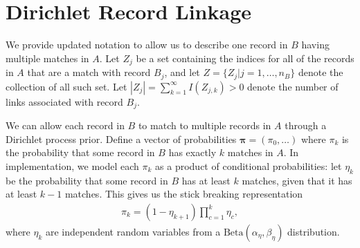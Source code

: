 \documentclass[12pt,letterpaper]{article}
\newcommand{\1}[1]{\mathbb{I}\!\left[#1\right]} %
\begin{document}
%
%

\section{Dirichlet Record Linkage}

We provide updated notation to allow us to describe one record in $B$ having multiple matches in $A$. Let $Z_j$ be a set containing the indices for all of the records in $A$ that are a match with record $B_j$, and let $Z = \{Z_j | j = 1, \ldots, n_B\}$ denote the collection of all such set. Let $|Z_j| = \sum_{k=1}^{\infty} I(Z_{j, k}) > 0$ denote the number of links associated with record $B_j$. 

We can allow each record in $B$ to match to multiple records in $A$ through a Dirichlet process prior. Define a vector of probabilities $\bm{\pi} = (\pi_0, \ldots)$ where $\pi_k$ is the probability that some record in $B$ has exactly $k$ matches in $A$. In implementation, we model each $\pi_k$ as a product of conditional probabilities: let $\eta_k$ be the probability that some record in $B$ has at least $k$ matches, given that it has at least $k-1$ matches. This gives us the stick breaking representation
\begin{align}
	\pi_k = (1 - \eta_{k+1}) \prod_{c=1}^{k} \eta_c, 
\end{align}
where $\eta_k$ are independent random variables from a $\text{Beta}(\alpha_{\eta}, \beta_{\eta})$ distribution.
\end{document}
